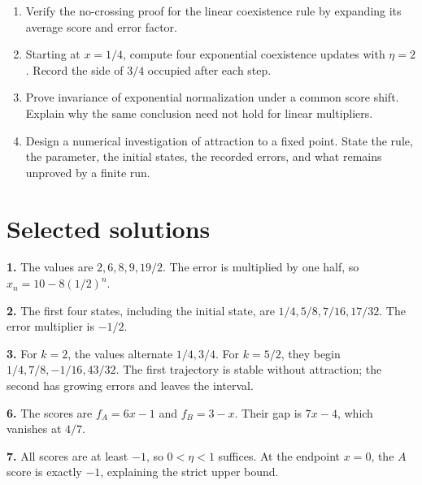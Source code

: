 \documentclass[11pt,oneside,openany]{book}
\theoremstyle{definition}
\theoremstyle{remark}
\newenvironment{exercises}{\begin{enumerate}[label=\thechapter.\arabic*,ref=\thechapter.\arabic*,leftmargin=2.8em,itemsep=6pt]}{\end{enumerate}}
\numberwithin{equation}{chapter}
\begin{document}
\begin{exercises}
\item 

Verify the no-crossing proof for the linear coexistence rule by expanding its average score and error factor.

\item 

Starting at \(x=1/4\), compute four exponential coexistence updates with \(\eta=2\). Record the side of \(3/4\) occupied after each step.

\item 

Prove invariance of exponential normalization under a common score shift. Explain why the same conclusion need not hold for linear multipliers.

\item 

Design a numerical investigation of attraction to a fixed point. State the rule, the parameter, the initial states, the recorded errors, and what remains unproved by a finite run.

\end{exercises}

\section{Selected solutions}\label{ch02-selected-solutions}

\textbf{1.} The values are \(2,6,8,9,19/2\). The error is multiplied by one half, so \(x_n=10-8(1/2)^n\).

\textbf{2.} The first four states, including the initial state, are \(1/4,5/8,7/16,17/32\). The error multiplier is \(-1/2\).

\textbf{3.} For \(k=2\), the values alternate \(1/4,3/4\). For \(k=5/2\), they begin \(1/4,7/8,-1/16,43/32\). The first trajectory is stable without attraction; the second has growing errors and leaves the interval.

\textbf{6.} The scores are \(f_A=6x-1\) and \(f_B=3-x\). Their gap is \(7x-4\), which vanishes at \(4/7\).

\textbf{7.} All scores are at least \(-1\), so \(0<\eta<1\) suffices. At the endpoint \(x=0\), the \(A\) score is exactly \(-1\), explaining the strict upper bound.
\end{document}
